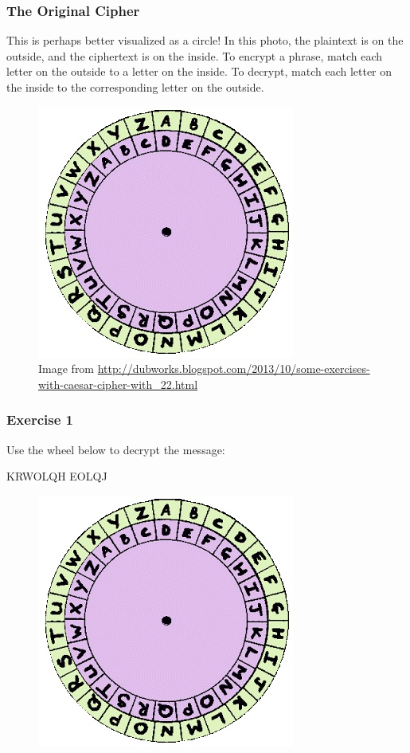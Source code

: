 \documentclass{beamer}
\newcommand{\<}{\langle}
\renewcommand{\>}{\rangle}
\begin{document}
\begin{frame}
\frametitle{The Original Cipher}

This is perhaps better visualized as a circle! In this photo, the plaintext is on the outside, and the ciphertext is on the inside. To encrypt a phrase, match each letter on the outside to a letter on the inside. To decrypt, match each letter on the inside to the corresponding letter on the outside. 
\begin{figure}
\includegraphics[scale=.3]{IMG/wheel.jpg}
\caption{\tiny Image from \url{http://dubworks.blogspot.com/2013/10/some-exercises-with-caesar-cipher-with_22.html}}
\end{figure}
\end{frame}


\begin{frame}
\frametitle{Exercise 1}

Use the wheel below to decrypt the message: 
\begin{center}
KRWOLQH EOLQJ
\end{center}
\begin{figure}
\includegraphics[scale=.5]{IMG/wheel.jpg}
\end{figure}
\end{frame}
\end{document}
